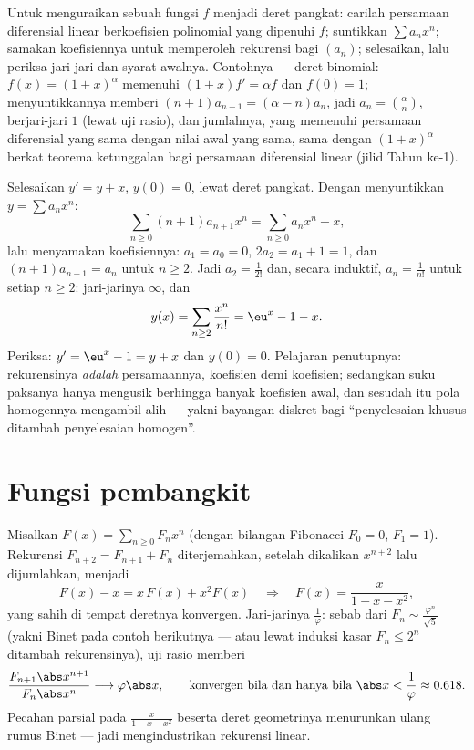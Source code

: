 \begin{method}\label{met:b2:powerseries:ode}
Untuk menguraikan sebuah fungsi $f$ menjadi deret pangkat: carilah
persamaan diferensial linear berkoefisien polinomial yang dipenuhi $f$;
suntikkan $\sum a_nx^n$; samakan koefisiennya untuk memperoleh rekurensi
bagi $(a_n)$; selesaikan, lalu periksa jari-jari dan syarat awalnya.
Contohnya --- deret binomial: $f(x) = (1+x)^\alpha$ memenuhi $(1+x)f' =
\alpha f$ dan $f(0) = 1$; menyuntikkannya memberi $(n+1)a_{n+1} =
(\alpha - n)a_n$, jadi $a_n = \binom{\alpha}{n}$, berjari-jari $1$
(lewat uji rasio), dan jumlahnya, yang memenuhi persamaan diferensial
yang sama dengan nilai awal yang sama, sama dengan $(1 + x)^\alpha$
berkat teorema ketunggalan bagi persamaan diferensial linear (jilid
Tahun ke-1).
\end{method}

\begin{example}\label{ex:b2:powerseries:odeforced}
Selesaikan $y' = y + x$, $y(0) = 0$, lewat deret pangkat. Dengan
menyuntikkan $y = \sum a_nx^n$:
\[
\sum_{n\geq0}(n+1)a_{n+1}x^n
= \sum_{n\geq0}a_nx^n + x ,
\]
lalu menyamakan koefisiennya: $a_1 = a_0 = 0$, $2a_2 = a_1 + 1
= 1$, dan $(n+1)a_{n+1} = a_n$ untuk $n \geq 2$. Jadi $a_2 =
\frac{1}{2!}$ dan, secara induktif, $a_n = \frac{1}{n!}$ untuk setiap
$n \geq 2$: jari-jarinya $\infty$, dan
\[
y(x) = \sum_{n\geq2}\frac{x^n}{n!} = \eu^x - 1 - x .
\]
Periksa: $y' = \eu^x - 1 = y + x$ dan $y(0) = 0$. Pelajaran
penutupnya: rekurensinya \emph{adalah} persamaannya, koefisien demi
koefisien; sedangkan suku paksanya hanya mengusik berhingga banyak
koefisien awal, dan sesudah itu pola homogennya mengambil
alih --- yakni bayangan diskret bagi ``penyelesaian khusus ditambah
penyelesaian homogen''.
\end{example}

\section{Fungsi pembangkit}

\begin{example}[Fibonacci]\label{ex:b2:powerseries:fibonacci}
Misalkan $F(x) = \sum_{n\geq0} F_n x^n$ (dengan bilangan Fibonacci $F_0
= 0$, $F_1 = 1$). Rekurensi $F_{n+2} = F_{n+1} + F_n$ diterjemahkan,
setelah dikalikan $x^{n+2}$ lalu dijumlahkan, menjadi
\[
F(x) - x = x\,F(x) + x^2 F(x)
\quad\Longrightarrow\quad
F(x) = \frac{x}{1 - x - x^2} ,
\]
yang sahih di tempat deretnya konvergen. Jari-jarinya
$\frac{1}{\varphi}$: sebab dari $F_n \sim
\frac{\varphi^n}{\sqrt5}$ (yakni Binet pada contoh berikutnya --- atau
lewat induksi kasar $F_n \leq 2^n$ ditambah rekurensinya), uji rasio
memberi
\[
\frac{F_{n+1}\abs x^{n+1}}{F_n\abs x^n}
\longrightarrow \varphi\abs x ,
\qquad\text{konvergen bila dan hanya bila } \abs x < \frac1\varphi
\approx 0.618 .
\] Pecahan parsial pada
$\frac{x}{1 - x - x^2}$ beserta deret geometrinya menurunkan ulang rumus
Binet --- jadi  mengindustrikan rekurensi
linear.
\end{example}

